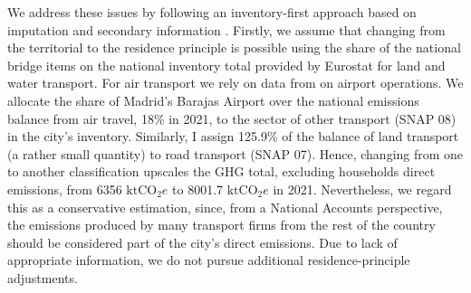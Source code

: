 \documentclass[
  10pt,
  twocolumn]{aft}
\begin{document}
We address these issues by following an inventory-first approach based
on imputation and secondary information
\citep{eurostat_manual_2015, corcoles_carbon_2024, sanchezserranoHuellaCarbonoHogares2023}.
Firstly, we assume that changing from the territorial to the residence
principle is possible using the share of the national bridge items on
the national inventory total provided by Eurostat for land and water
transport. For air transport we rely on data from
\citet{aena_estadisticas_2023} on airport operations. We allocate the
share of Madrid's Barajas Airport over the national emissions balance
from air travel, 18\% in 2021, to the sector of other transport (SNAP
08) in the city's inventory. Similarly, I assign 125.9\% of the balance
of land transport (a rather small quantity) to road transport (SNAP 07).
Hence, changing from one to another classification upscales the GHG
total, excluding households direct emissions, from 6356
\(\text{ktCO}_2e\) to 8001.7 \(\text{ktCO}_2e\) in 2021. Nevertheless,
we regard this as a conservative estimation, since, from a National
Accounts perspective, the emissions produced by many transport firms
from the rest of the country should be considered part of the city's
direct emissions. Due to lack of appropriate information, we do not
pursue additional residence-principle adjustments.
\end{document}
